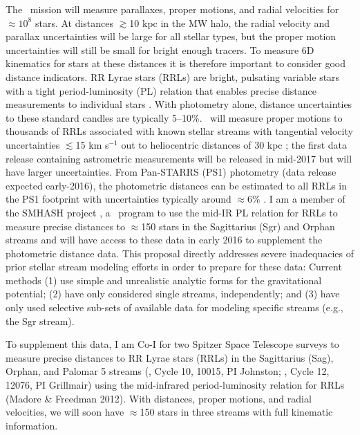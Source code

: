 The \gaia\ mission will measure parallaxes, proper motions, and radial velocities for $\approx$$10^{8}$ stars. At distances $\gtrsim$10 kpc in the MW halo, the radial velocity and parallax uncertainties will be large for all stellar types, but the proper motion uncertainties will still be small for bright enough tracers. To measure  6D kinematics for stars at these distances it is therefore important to consider good distance indicators. RR Lyrae stars (RRLs) are bright, pulsating variable stars with a tight period-luminosity (PL) relation that enables precise distance measurements to individual stars \citep{klein14}. With photometry alone, distance uncertainties to these standard candles are typically 5--10\%. \gaia\ will measure proper motions to thousands of RRLs associated with known stellar streams with tangential velocity uncertainties $\lesssim$15 km s$^{-1}$ out to heliocentric distances of 30 kpc \citep{apw13}; the first data release containing astrometric measurements will be released in mid-2017 but will have larger uncertainties. From Pan-STARRS (PS1) photometry (data release expected early-2016), the photometric distances can be estimated to all RRLs in the PS1 footprint with uncertainties typically around $\approx$6\% \citep{sesar13b}. I am a member of the SMHASH project \citep{smashprop}, a \spitzer\ program to use the mid-IR PL relation for RRLs to measure precise distances to $\approx$150 stars in the Sagittarius (Sgr) and Orphan streams and will have access to these data in early 2016 to supplement the photometric distance data. This proposal directly addresses severe inadequacies of prior stellar stream modeling efforts in order to prepare for these data: Current methods (1) use simple and unrealistic analytic forms for the gravitational potential; (2) have only considered single streams, independently; and (3) have only used selective sub-sets of available data for modeling specific streams (e.g., the Sgr stream). 

To supplement this data, I am Co-I for two Spitzer Space Telescope surveys to measure precise distances to RR Lyrae stars (RRLs) in the Sagittarius (Sag), Orphan, and Palomar 5 streams (, Cycle 10, 10015, PI Johnston; , Cycle 12, 12076, PI Grillmair) using the mid-infrared period-luminosity relation for RRLs (Madore \& Freedman 2012). With distances, proper motions, and radial velocities, we will soon have $\approx$150 stars in three streams with full kinematic information. 


